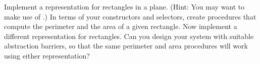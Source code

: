 \begin{exercise}
	\label{Exercise 2.3}
	Implement a representation for rectangles in a plane.
	(Hint: You may want to make use of .)
	In terms of your constructors and selectors, create procedures that compute the perimeter and the area of a given rectangle.
	Now implement a different representation for rectangles.
	Can you design your system with suitable abstraction barriers, so that the same perimeter and area procedures will work using either representation?
\end{exercise}
